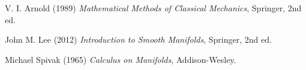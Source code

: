 \documentclass[12pt]{article}
\begin{document}
\begin{thebibliography}{9}
V. I. Arnold (1989) \emph{Mathematical Methods of Classical Mechanics}, Springer, 2nd ed.

John M. Lee (2012) \emph{Introduction to Smooth Manifolds}, Springer, 2nd ed.

Michael Spivak (1965) \emph{Calculus on Manifolds}, Addison-Wesley.
\end{thebibliography}












\end{document}
